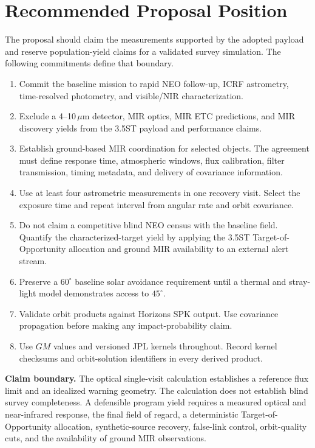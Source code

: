 \section{Recommended Proposal Position}

The proposal should claim the measurements supported by the adopted payload
and reserve population-yield claims for a validated survey simulation. The
following commitments define that boundary.

\begin{enumerate}[leftmargin=7mm,itemsep=2.2mm]
\item Commit the baseline mission to rapid NEO follow-up, ICRF astrometry,
time-resolved photometry, and visible/NIR characterization.
\item Exclude a 4--10\,$\mu$m detector, MIR optics, MIR ETC predictions, and
MIR discovery yields from the 3.5ST payload and performance claims.
\item Establish ground-based MIR coordination for selected objects. The
agreement must define response time, atmospheric windows, flux calibration,
filter transmission, timing metadata, and delivery of covariance information.
\item Use at least four astrometric measurements in one recovery visit.
Select the exposure time and repeat interval from angular rate and orbit
covariance.
\item Do not claim a competitive blind NEO census with the baseline field.
Quantify the characterized-target yield by applying the 3.5ST
Target-of-Opportunity allocation and ground MIR availability to an external
alert stream.
\item Preserve a $60^\circ$ baseline solar avoidance requirement until a
thermal and stray-light model demonstrates access to $45^\circ$.
\item Validate orbit products against Horizons SPK output. Use covariance
propagation before making any impact-probability claim.
\item Use $GM$ values and versioned JPL kernels throughout. Record kernel
checksums and orbit-solution identifiers in every derived product.
\end{enumerate}

\begin{warningbox}
\textbf{\color{cRed}Claim boundary.}
The optical single-visit calculation establishes a reference flux limit and
an idealized warning geometry. The calculation does not establish blind
survey completeness. A defensible program yield requires a measured optical
and near-infrared response, the final field of regard, a deterministic
Target-of-Opportunity allocation, synthetic-source recovery, false-link
control, orbit-quality cuts, and the availability of ground MIR observations.
\end{warningbox}

